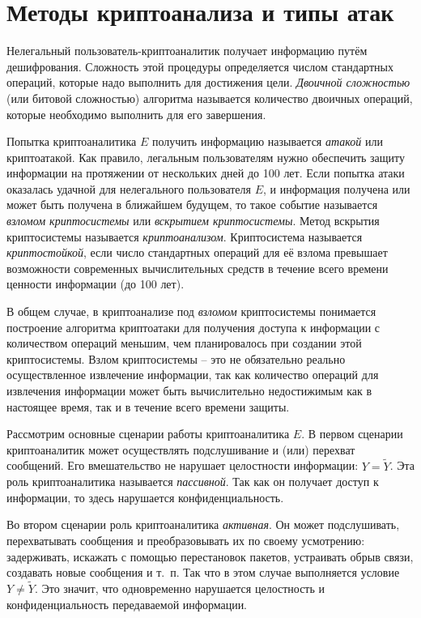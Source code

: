 \section{Методы криптоанализа и типы атак}

Нелегальный пользователь-криптоаналитик получает информацию путём дешифрования. Сложность этой процедуры определяется числом стандартных операций, которые надо выполнить для достижения цели. \emph{Двоичной сложностью} (или битовой сложностью) алгоритма называется количество двоичных операций, которые необходимо выполнить для его завершения.

Попытка криптоаналитика $E$ получить информацию называется \emph{атакой} или криптоатакой. Как правило, легальным пользователям нужно обеспечить защиту информации на протяжении от нескольких дней до 100 лет. Если попытка атаки оказалась удачной для нелегального пользователя $E$, и информация получена или может быть получена в ближайшем будущем, то такое событие называется \emph{взломом криптосистемы} или \emph{вскрытием криптосистемы}. Метод вскрытия криптосистемы называется \emph{криптоанализом}. Криптосистема называется \emph{криптостойкой}, если число стандартных операций для её взлома превышает возможности современных вычислительных средств в течение всего времени ценности информации (до 100 лет).

В общем случае, в криптоанализе под \emph{взломом} криптосистемы понимается построение алгоритма криптоатаки для получения доступа к информации с количеством операций меньшим, чем планировалось при создании этой криптосистемы. Взлом криптосистемы -- это не обязательно реально осуществленное извлечение информации, так как количество операций для извлечения информации может быть вычислительно недостижимым как в настоящее время, так и в течение всего времени защиты.

Рассмотрим основные сценарии работы криптоаналитика $E$. В первом сценарии криптоаналитик может осуществлять подслушивание и (или) перехват сообщений. Его вмешательство не нарушает целостности информации: $Y=\widetilde{Y}$. Эта роль криптоаналитика называется \emph{пассивной}. Так как он получает доступ к информации, то здесь нарушается конфиденциальность.

Во втором сценарии роль криптоаналитика \emph{активная}. Он может подслушивать, перехватывать сообщения и преобразовывать их по своему усмотрению: задерживать, искажать с помощью перестановок пакетов, устраивать обрыв связи, создавать новые сообщения и т.~п. Так что в этом случае выполняется условие $Y \neq \widetilde{Y}$. Это значит, что одновременно нарушается целостность и конфиденциальность передаваемой информации.

